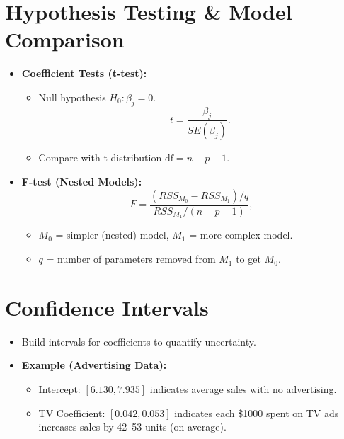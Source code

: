 \documentclass[10pt]{article}
\begin{document}
\section{Hypothesis Testing \& Model Comparison}
\begin{itemize}
    \item \textbf{Coefficient Tests (t-test):}
    \begin{itemize}
        \item Null hypothesis \(H_0:\beta_j=0\).
        \[
        t = \frac{\beta_{j}}{SE(\beta_{j})}.
        \]
        \item Compare with t-distribution \(\mathrm{df}=n-p-1\).
    \end{itemize}
    \item \textbf{F-test (Nested Models):}
    \[
    F = \frac{(RSS_{M_{0}} - RSS_{M_{1}})/q}{RSS_{M_{1}}/(n-p-1)},
    \]
    \begin{itemize}
        \item \(M_0\) = simpler (nested) model, \(M_1\) = more complex model.
        \item \(q\) = number of parameters removed from \(M_1\) to get \(M_0\).
    \end{itemize}
\end{itemize}

\section{Confidence Intervals}
\begin{itemize}
    \item Build intervals for coefficients to quantify uncertainty.
    \item \textbf{Example (Advertising Data):}
    \begin{itemize}
        \item Intercept: \([6.130, 7.935]\) indicates average sales with no advertising.
        \item TV Coefficient: \([0.042, 0.053]\) indicates each \$1000 spent on TV ads increases sales by 42--53 units (on average).
    \end{itemize}
\end{itemize}
\end{document}
